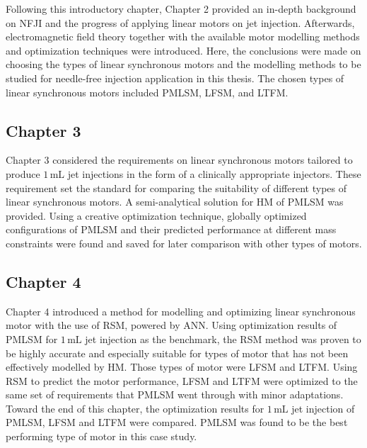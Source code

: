     Following this introductory chapter, Chapter 2 provided an in-depth background on \acs{NFJI} and the progress of applying linear motors on jet injection. Afterwards, electromagnetic field theory together with the available motor modelling methods and optimization techniques were introduced. Here, the conclusions were made on choosing the types of linear synchronous motors and the modelling methods to be studied for needle-free injection application in this thesis. The chosen types of linear synchronous motors included \acf{PMLSM}, \acf{LFSM}, and \acf{LTFM}.
    
    \subsection{Chapter 3}  \label{Chapter:intro/outline/chapter3}
    
    
    Chapter 3 considered the requirements on linear synchronous motors tailored to produce $1\,\mathrm{mL}$ jet injections in the form of a clinically appropriate injectors. These requirement set the standard for comparing the suitability of different types of linear synchronous motors. A semi-analytical solution for \acf{HM} of \acf{PMLSM} was provided. Using a creative optimization technique, globally optimized configurations of \acf{PMLSM} and their predicted performance at different mass constraints were found and saved for later comparison with other types of motors. 
    
    
    \subsection{Chapter 4}  \label{Chapter:intro/outline/chapter4}
    
    
    Chapter 4 introduced a method for modelling and optimizing linear synchronous motor with the use of \acf{RSM}, powered by \acf{ANN}. Using optimization results of \acs{PMLSM} for $1\,\mathrm{mL}$ jet injection as the benchmark, the \acf{RSM} method was proven to be highly accurate and especially suitable for types of motor that has not been effectively modelled by \acs{HM}. Those types of motor were \acs{LFSM} and \acs{LTFM}. Using \acf{RSM} to predict the motor performance, \acs{LFSM} and \acs{LTFM} were optimized to the same set of requirements that \acs{PMLSM} went through with minor adaptations. Toward the end of this chapter, the optimization results for $1\,\mathrm{mL}$ jet injection of \acs{PMLSM}, \acs{LFSM} and \acs{LTFM} were compared. \acs{PMLSM} was found to be the best performing type of motor in this case study.
    
